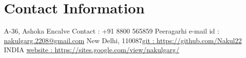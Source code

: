 \newenvironment{outerlist}[1][\enskip\textbullet]%
        {\begin{itemize}[#1,leftmargin=*]}{\end{itemize}%
         \vspace{-.6\baselineskip}}

\newenvironment{lonelist}[1][\enskip\textbullet]%
        {\begin{list}{#1}{%
        \setlength{\partopsep}{0pt}%
        \setlength{\topsep}{0pt}}}
        {\end{list}\vspace{-.6\baselineskip}}

\newenvironment{innerlist}[1][\enskip\textbullet]%
        {\begin{itemize}[#1,leftmargin=*,parsep=0pt,itemsep=0pt,topsep=0pt,partopsep=0pt]}
        {\end{itemize}}

\newenvironment{loneinnerlist}[1][\enskip\textbullet]%
        {\begin{itemize}[#1,leftmargin=*,parsep=0pt,itemsep=0pt,topsep=0pt,partopsep=0pt]}
        {\end{itemize}\vspace{-.6\baselineskip}}

\newcommand{\blankline}{\quad\pagebreak[3]}
\newcommand{\halfblankline}{\quad\vspace{-0.5\baselineskip}\pagebreak[3]}

\newcommand\doilink[1]{\href{http://dx.doi.org/#1}{#1}}
\newcommand\doi[1]{doi:\doilink{#1}}

\providecommand*\url[1]{\href{#1}{#1}}
\renewcommand*\url[1]{\href{#1}{\texttt{#1}}}
\providecommand*\email[1]{\href{mailto:#1}{#1}}

\providecommand\BibTeX{{B\kern-.05em{\sc i\kern-.025em b}\kern-.08em
    \TeX}}
\providecommand\Matlab{\textsc{Matlab}}




\section{Contact Information}

\newlength{\rcollength}\setlength{\rcollength}{1.4in}%


A-36, Ashoka Encalve  \hfill {Contact : +91 8800 565859} \newline
Peeragarhi \hfill {e-mail id : \email{nakulgarg.2208@gmail.com}} \newline
New Delhi, 110087\hfill  \href{https://github.com/Nakul22}{git : https://github.com/Nakul22} \newline
INDIA \hfill \href{https://goo.gl/bs3Snq}{website : https://sites.google.com/view/nakulgarg/}

